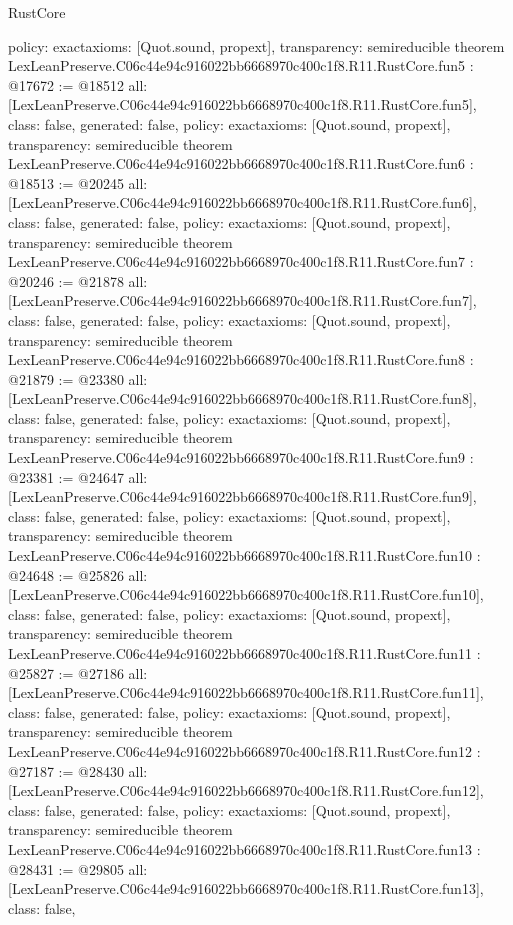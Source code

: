 \begin{lexlean}{RustCore}
\begin{coremodule}
{  policy: exact{axioms: [Quot.sound, propext]},
  transparency: semireducible
}
theorem LexLeanPreserve.C06c44e94c916022bb6668970c400c1f8.R11.RustCore.fun5 : @17672 := @18512 {
  all: [LexLeanPreserve.C06c44e94c916022bb6668970c400c1f8.R11.RustCore.fun5],
  class: false,
  generated: false,
  policy: exact{axioms: [Quot.sound, propext]},
  transparency: semireducible
}
theorem LexLeanPreserve.C06c44e94c916022bb6668970c400c1f8.R11.RustCore.fun6 : @18513 := @20245 {
  all: [LexLeanPreserve.C06c44e94c916022bb6668970c400c1f8.R11.RustCore.fun6],
  class: false,
  generated: false,
  policy: exact{axioms: [Quot.sound, propext]},
  transparency: semireducible
}
theorem LexLeanPreserve.C06c44e94c916022bb6668970c400c1f8.R11.RustCore.fun7 : @20246 := @21878 {
  all: [LexLeanPreserve.C06c44e94c916022bb6668970c400c1f8.R11.RustCore.fun7],
  class: false,
  generated: false,
  policy: exact{axioms: [Quot.sound, propext]},
  transparency: semireducible
}
theorem LexLeanPreserve.C06c44e94c916022bb6668970c400c1f8.R11.RustCore.fun8 : @21879 := @23380 {
  all: [LexLeanPreserve.C06c44e94c916022bb6668970c400c1f8.R11.RustCore.fun8],
  class: false,
  generated: false,
  policy: exact{axioms: [Quot.sound, propext]},
  transparency: semireducible
}
theorem LexLeanPreserve.C06c44e94c916022bb6668970c400c1f8.R11.RustCore.fun9 : @23381 := @24647 {
  all: [LexLeanPreserve.C06c44e94c916022bb6668970c400c1f8.R11.RustCore.fun9],
  class: false,
  generated: false,
  policy: exact{axioms: [Quot.sound, propext]},
  transparency: semireducible
}
theorem LexLeanPreserve.C06c44e94c916022bb6668970c400c1f8.R11.RustCore.fun10 : @24648 := @25826 {
  all: [LexLeanPreserve.C06c44e94c916022bb6668970c400c1f8.R11.RustCore.fun10],
  class: false,
  generated: false,
  policy: exact{axioms: [Quot.sound, propext]},
  transparency: semireducible
}
theorem LexLeanPreserve.C06c44e94c916022bb6668970c400c1f8.R11.RustCore.fun11 : @25827 := @27186 {
  all: [LexLeanPreserve.C06c44e94c916022bb6668970c400c1f8.R11.RustCore.fun11],
  class: false,
  generated: false,
  policy: exact{axioms: [Quot.sound, propext]},
  transparency: semireducible
}
theorem LexLeanPreserve.C06c44e94c916022bb6668970c400c1f8.R11.RustCore.fun12 : @27187 := @28430 {
  all: [LexLeanPreserve.C06c44e94c916022bb6668970c400c1f8.R11.RustCore.fun12],
  class: false,
  generated: false,
  policy: exact{axioms: [Quot.sound, propext]},
  transparency: semireducible
}
theorem LexLeanPreserve.C06c44e94c916022bb6668970c400c1f8.R11.RustCore.fun13 : @28431 := @29805 {
  all: [LexLeanPreserve.C06c44e94c916022bb6668970c400c1f8.R11.RustCore.fun13],
  class: false,
}
\end{coremodule}
\end{lexlean}
